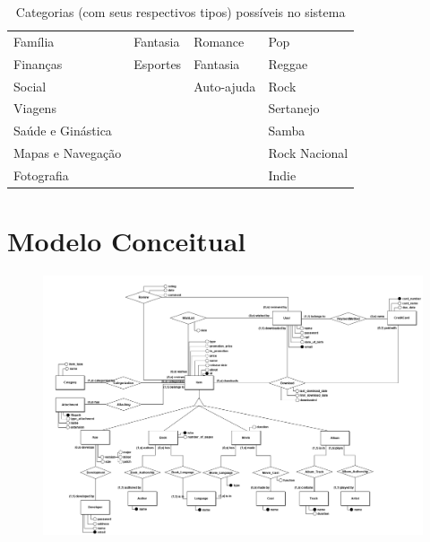 \documentclass[a4paper, 11pt]{article}
\begin{document}
\begin{table}[H]
{\begin{tabular}{@{}llll@{}}
\multicolumn{1}{l|}{Família} & 
\multicolumn{1}{l|}{Fantasia} & \multicolumn{1}{l|}{Romance} & Pop \\[5pt]

\multicolumn{1}{l|}{Finanças} & 
\multicolumn{1}{l|}{Esportes} & \multicolumn{1}{l|}{Fantasia} & Reggae \\[5pt]

\multicolumn{1}{l|}{Social} & 
\multicolumn{1}{l|}{} & \multicolumn{1}{l|}{Auto-ajuda} & Rock \\[5pt]

\multicolumn{1}{l|}{Viagens} & 
\multicolumn{1}{l|}{} & \multicolumn{1}{l|}{} & Sertanejo \\[5pt]

\multicolumn{1}{l|}{Saúde e Ginástica} & 
\multicolumn{1}{l|}{} & \multicolumn{1}{l|}{} & Samba \\[5pt]

\multicolumn{1}{l|}{Mapas e Navegação} & 
\multicolumn{1}{l|}{} & \multicolumn{1}{l|}{} & Rock Nacional \\[5pt]

\multicolumn{1}{l|}{Fotografia} & 
\multicolumn{1}{l|}{} & \multicolumn{1}{l|}{} & Indie \\ \bottomrule
\end{tabular}%
}
\caption{Categorias (com seus respectivos tipos) possíveis no sistema}
\end{table}


\newpage
\section*{Modelo Conceitual}
\begin{figure}[H]
\includegraphics[angle=90, height=0.75\paperheight]{images/modeloConceitual.png}
\end{figure}
\end{document}
